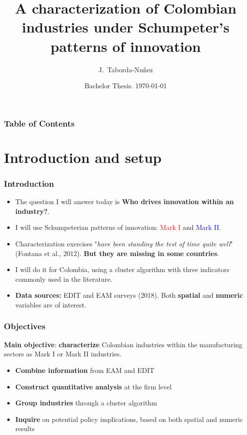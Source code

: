 \documentclass{beamer}
\begin{document}
	\title[J.S Industry Characterization]{
	\textbf{A characterization of Colombian industries under Schumpeter's patterns of innovation}
	}   
	\date[BA 2022-30]{Bachelor Thesis. \today} 
	\author[Taborda-Nuñez]{J.~Taborda-Nuñez}
	\begin{frame} 
		\titlepage 
	\end{frame}  

	\begin{frame}
		\frametitle{Table of Contents}
		\tableofcontents
	\end{frame}


	\AtBeginSection[]
	{
		\begin{frame}
			\frametitle{Table of Contents}
			\tableofcontents[currentsection]
		\end{frame}
	}
	
\section{Introduction and setup}
	\begin{frame}[allowframebreaks]
		\frametitle{Introduction} 
		\begin{itemize}
			\item The question I will answer today is \textbf{Who drives innovation within an industry?}.
			\item I will use Schumpeterian patterns of innovation: \textcolor{red}{Mark I} and \textcolor{blue}{Mark II}.
			\item Characterization exercises "\textit{have been standing the test of time quite well}" (Fontana et al., 2012). \textbf{But they are missing in some countries}.
			\item I will do it for Colombia, using a cluster algorithm with three indicators commonly used in the literature.
			\item \textbf{Data sources:} EDIT and EAM surveys (2018). Both \textbf{spatial} and \textbf{numeric} variables are of interest.
		\end{itemize}
	\end{frame}	
	\begin{frame}
		\frametitle{Objectives}
		\textbf{Main objective}: \textbf{characterize} Colombian industries within the manufacturing sectors as Mark I or Mark II industries.
		\begin{itemize}
			\item \textbf{Combine information} from EAM and EDIT
			\item \textbf{Construct quantitative analysis} at the firm level
			\item \textbf{Group industries} through a cluster algorithm
			\item \textbf{Inquire} on potential policy implications, based on both spatial and numeric results
		\end{itemize}
	\end{frame}
\end{document}

